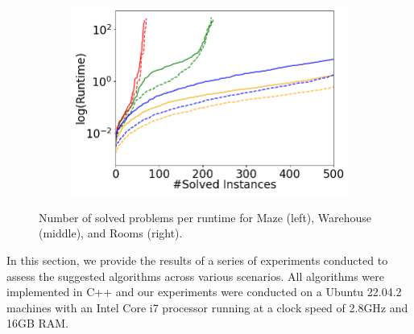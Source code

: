 \documentclass[letterpaper]{article} %
\def\
UrlFont{\rm}  %
\theoremstyle{definition}
\begin{document}
\begin{figure}[tbhp]
\begin{subfigure}[b]{0.69\columnwidth}
    \end{subfigure}
    \begin{subfigure}[b]{0.69\columnwidth}\centering
      \includegraphics[width=\columnwidth]{Figures/room/mixed_small_figures/cactus_with_dashed_lines.png}
    \end{subfigure}
    \caption{Number of solved problems per runtime for Maze (left), Warehouse (middle), and Rooms (right).}
    \label{fig:cactus-w-dashed-lines}
\end{figure}

In this section, we provide the results of a series of experiments conducted to assess the suggested algorithms across various scenarios. All algorithms were implemented in C++ and our experiments were conducted on a Ubuntu 22.04.2  machines with an Intel Core i7 processor running at a clock speed of 2.8GHz and 16GB RAM.
\end{document}
